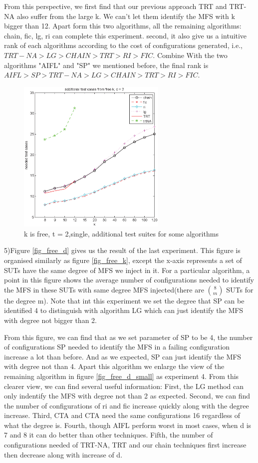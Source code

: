 \documentclass[10pt,journal,cspaper,compsoc]{IEEEtran}
\begin{document}
From this perspective, we first find that our previous approach TRT and TRT-NA also suffer from the large k. We can't let them identify the MFS with k bigger than 12. Apart form this two algorithms, all the remaining algorithms: chain, fic, lg, ri can complete this experiment. second, it also give us a intuitive rank of each algorithms according to the cost of configurations generated, i.e., $TRT-NA > LG > CHAIN > TRT > RI > FIC$. Combine With the two algorithms "AIFL" and "SP" we mentioned before, the final rank is $AIFL > SP > TRT-NA > LG > CHAIN > TRT > RI > FIC$.

\begin{figure}
 \centering
 \includegraphics[width=2.8in]{k-2-s-small.eps}
 \caption{k is free, t = 2,single, additional test suites for some algorithms}
 \label{fig_free_k_small}
\end{figure}


5)Figure \ref{fig_free_d} gives us the result of the last experiment. This figure is organised similarly as figure \ref{fig_free_k}, except the x-axis represents a set of SUTs have the same degree of MFS we inject in it. For a particular algorithm, a point in this figure shows the average number of configurations needed to identify the MFS in these SUTs with same degree MFS injected(there are $\binom{8}{m}$ SUTs for the degree m). Note that int this experiment we set the degree that SP can be identified 4 to distinguish with algorithm LG which can just identify the MFS with degree not bigger than 2.

From this figure, we can find that as we set parameter of SP to be 4, the number of configurations SP needed to identify the MFS in a failing configuration increase a lot than before. And as we expected, SP can just identify the MFS with degree not than 4.  Apart this algorithm we enlarge the view of the remaining algorithm in figure \ref{fig_free_d_small} as experiment 4. From this clearer view, we can find several useful information: First, the LG method can only indentify the MFS with degree not than 2 as expected.  Second, we can find the number of configurations of ri and fic increase quickly along with the degree increase. Third, CTA and CTA need the same configurations 16 regardless of what the degree is. Fourth, though AIFL perform worst in most cases, when d is 7 and 8 it can do better than other techniques. Fifth, the number of configurations needed of TRT-NA, TRT and our chain techniques first increase then decrease along with increase of d.
\end{document}
